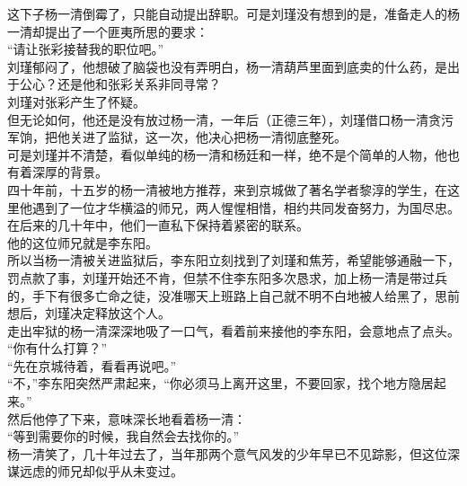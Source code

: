 \begin{multicols}{\theparacolNo}
这下子杨一清倒霉了，只能自动提出辞职。可是刘瑾没有想到的是，准备走人的杨一清却提出了一个匪夷所思的要求：\\

“请让张彩接替我的职位吧。”\\

刘瑾郁闷了，他想破了脑袋也没有弄明白，杨一清葫芦里面到底卖的什么药，是出于公心？还是他和张彩关系非同寻常？\\

刘瑾对张彩产生了怀疑。\\

但无论如何，他还是没有放过杨一清，一年后（正德三年），刘瑾借口杨一清贪污军饷，把他关进了监狱，这一次，他决心把杨一清彻底整死。\\

可是刘瑾并不清楚，看似单纯的杨一清和杨廷和一样，绝不是个简单的人物，他也有着深厚的背景。\\

四十年前，十五岁的杨一清被地方推荐，来到京城做了著名学者黎淳的学生，在这里他遇到了一位才华横溢的师兄，两人惺惺相惜，相约共同发奋努力，为国尽忠。在后来的几十年中，他们一直私下保持着紧密的联系。\\

他的这位师兄就是李东阳。\\

所以当杨一清被关进监狱后，李东阳立刻找到了刘瑾和焦芳，希望能够通融一下，罚点款了事，刘瑾开始还不肯，但禁不住李东阳多次恳求，加上杨一清是带过兵的，手下有很多亡命之徒，没准哪天上班路上自己就不明不白地被人给黑了，思前想后，刘瑾决定释放这个人。\\

走出牢狱的杨一清深深地吸了一口气，看着前来接他的李东阳，会意地点了点头。\\

“你有什么打算？”\\

“先在京城待着，看看再说吧。”\\

“不，”李东阳突然严肃起来，“你必须马上离开这里，不要回家，找个地方隐居起来。”\\

然后他停了下来，意味深长地看着杨一清：\\

“等到需要你的时候，我自然会去找你的。”\\

杨一清笑了，几十年过去了，当年那两个意气风发的少年早已不见踪影，但这位深谋远虑的师兄却似乎从未变过。\\


\end{multicols}

